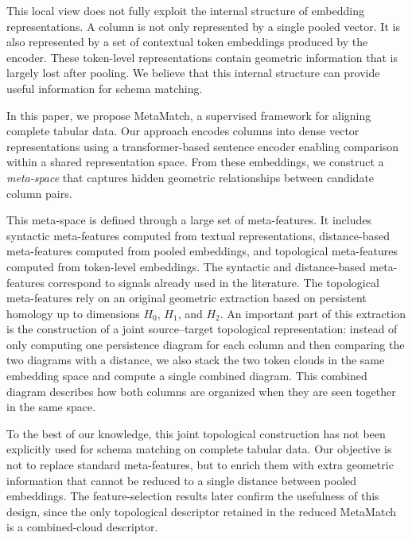 \documentclass[sigconf, nonacm]{acmart}
\begin{document}
This local view does not fully exploit the internal structure of embedding representations. A column is not only represented by a single pooled vector. It is also represented by a set of contextual token embeddings produced by the encoder. These token-level representations contain geometric information that is largely lost after pooling. We believe that this internal structure can provide useful information for schema matching.

In this paper, we propose MetaMatch, a supervised framework for aligning complete tabular data. Our approach encodes columns into dense vector representations using a transformer-based sentence encoder enabling comparison within a shared representation space. From these embeddings, we construct a \textit{meta-space} that captures hidden geometric relationships between candidate column pairs.

This meta-space is defined through a large set of meta-features. It includes syntactic meta-features computed from textual representations, distance-based meta-features computed from pooled embeddings, and topological meta-features computed from token-level embeddings. The syntactic and distance-based meta-features correspond to signals already used in the literature. The topological meta-features rely on an original geometric extraction based on persistent homology up to dimensions \(H_0\), \(H_1\), and \(H_2\). An important part of this extraction is the construction of a joint source--target topological representation: instead of only computing one persistence diagram for each column and then comparing the two diagrams with a distance, we also stack the two token clouds in the same embedding space and compute a single combined diagram. This combined diagram describes how both columns are organized when they are seen together in the same space.

To the best of our knowledge, this joint topological construction has not been explicitly used for schema matching on complete tabular data. Our objective is not to replace standard meta-features, but to enrich them with extra geometric information that cannot be reduced to a single distance between pooled embeddings. The feature-selection results later confirm the usefulness of this design, since the only topological descriptor retained in the reduced MetaMatch is a combined-cloud descriptor.
\end{document}
